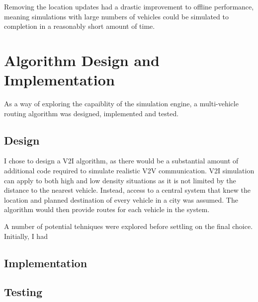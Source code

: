 \documentclass[ %
                    author={Alexander Hill},
                supervisor={Dr. Benjamin Sach},
                    degree={MEng},
                     title={MARMOSET},
                  subtitle={Multi-Agent Route Management using Online Simulation for Efficient Transportation},
                      type={research},
                      year={2016} ]{dissertation}
\begin{document}
Removing the location updates had a drastic improvement to offline performance,
meaning simulations with large numbers of vehicles could be simulated to
completion in a reasonably short amount of time.

\section{Algorithm Design and Implementation}

As a way of exploring the capaiblity of the simulation engine, a multi-vehicle
routing algorithm was designed, implemented and tested.

\subsection{Design}

I chose to design a V2I algorithm, as there would be a substantial amount of
additional code required to simulate realistic V2V communication. V2I simulation
can apply to both high and low density situations as it is not limited by the
distance to the nearest vehicle. Instead, access to a central system that knew
the location and planned destination of every vehicle in a city was assumed. The
algorithm would then provide routes for each vehicle in the system.

A number of potential tehniques were explored before settling on the final
choice. Initially, I had

\subsection{Implementation}

\subsection{Testing}


\end{document}
